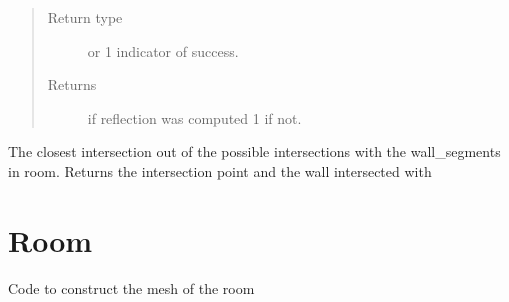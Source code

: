 \documentclass[letterpaper,10pt,english]{sphinxmanual}
\begin{document}
\begin{fulllineitems}
\begin{fulllineitems}
\begin{itemize}
\begin{itemize}
\end{itemize}

\end{itemize}
\begin{quote}\begin{description}
\item[{Return type}]  or 1 indicator of success.

\item[{Returns}]  if  reflection was computed 1 if not.

\end{description}\end{quote}

\end{fulllineitems}


\begin{fulllineitems}
\label{index:Rays.Ray.room_collision_point}
The closest intersection out of the possible intersections with
the wall\_segments in room. Returns the intersection point and the
wall intersected with

\end{fulllineitems}


\end{fulllineitems}



\chapter{Room}
\label{index:module-Room}\label{index:room}
Code to construct the mesh of the room
\end{document}
